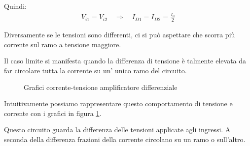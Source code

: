 \documentclass[../template]{subfiles}
\begin{document}
Quindi:
\begin{align*}
    V_{i1} = V_{i2} \quad \Rightarrow \quad I_{D1} = I_{D2} = \frac{I_0}{2}
\end{align*}

Diversamente se le tensioni sono differenti, ci si può aspettare che scorra più corrente sul ramo a tensione maggiore.

Il caso limite si manifesta quando la differenza di tensione è talmente elevata da far circolare tutta la corrente
su un' unico ramo del circuito.


\begin{figure}[h]

    \caption{Grafici corrente-tensione amplificatore differenziale}
    \label{fig:tensione_corrente_opamp}
\end{figure}

Intuitivamente possiamo rappresentare questo comportamento di tensione e corrente con i grafici in figura \ref{fig:tensione_corrente_opamp}.

Questo circuito guarda la differenza delle tensioni applicate agli ingressi.
A seconda della differenza frazioni della corrente circolano su un ramo o sull'altro.
\end{document}

